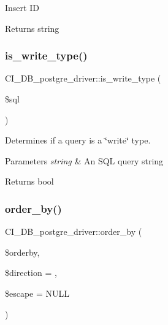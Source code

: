 Insert ID

\begin{DoxyReturn}{Returns}
string 
\end{DoxyReturn}
\mbox{\label{class_c_i___d_b__postgre__driver_a13091d7a398eda43e051d06f321077a7}} 
\subsubsection{\texorpdfstring{is\+\_\+write\+\_\+type()}{is\_write\_type()}}
{\footnotesize\ttfamily C\+I\+\_\+\+D\+B\+\_\+postgre\+\_\+driver\+::is\+\_\+write\+\_\+type (\begin{DoxyParamCaption}\item[{}]{\$sql }\end{DoxyParamCaption})}

Determines if a query is a \char`\"{}write\char`\"{} type.


\begin{DoxyParams}{Parameters}
{\em string} & An S\+QL query string \\
\hline
\end{DoxyParams}
\begin{DoxyReturn}{Returns}
bool 
\end{DoxyReturn}
\mbox{\label{class_c_i___d_b__postgre__driver_ab30bc24a439623b27ec29af1b6c512e0}} 
\subsubsection{\texorpdfstring{order\+\_\+by()}{order\_by()}}
{\footnotesize\ttfamily C\+I\+\_\+\+D\+B\+\_\+postgre\+\_\+driver\+::order\+\_\+by (\begin{DoxyParamCaption}\item[{}]{\$orderby,  }\item[{}]{\$direction = {\ttfamily \textquotesingle{}\textquotesingle{}},  }\item[{}]{\$escape = {\ttfamily NULL} }\end{DoxyParamCaption})}

